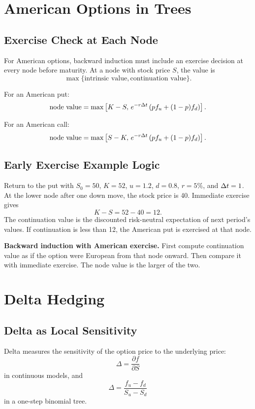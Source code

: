 \section{American Options in Trees}

\subsection{Exercise Check at Each Node}

For American options, backward induction must include an exercise decision at
every node before maturity. At a node with stock price $S$, the value is
\[
    \max\{\text{intrinsic value},\text{continuation value}\}.
\]

For an American put:
\[
    \text{node value}
    =
    \max\left[
        K-S,\,
        e^{-r\Delta t}\left(p f_u+(1-p)f_d\right)
    \right].
\]

For an American call:
\[
    \text{node value}
    =
    \max\left[
        S-K,\,
        e^{-r\Delta t}\left(p f_u+(1-p)f_d\right)
    \right].
\]

\subsection{Early Exercise Example Logic}

Return to the put with $S_0=50$, $K=52$, $u=1.2$, $d=0.8$, $r=5\%$, and
$\Delta t=1$. At the lower node after one down move, the stock price is 40. Immediate
exercise gives
\[
    K-S=52-40=12.
\]
The continuation value is the discounted risk-neutral expectation of next
period's values. If continuation is less than 12, the American put is exercised
at that node.

\begin{boxD}
\textbf{Backward induction with American exercise.} First compute continuation
value as if the option were European from that node onward. Then compare it with
immediate exercise. The node value is the larger of the two.
\end{boxD}

\section{Delta Hedging}

\subsection{Delta as Local Sensitivity}

Delta measures the sensitivity of the option price to the underlying price:
\[
    \Delta
    =
    \frac{\partial f}{\partial S}
\]
in continuous models, and
\[
    \Delta
    =
    \frac{f_u-f_d}{S_u-S_d}
\]
in a one-step binomial tree.

